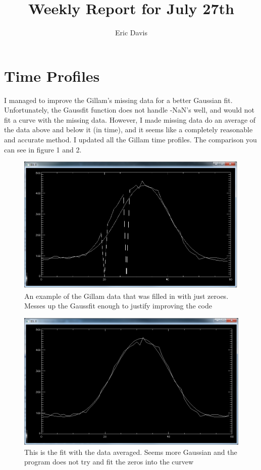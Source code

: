 \documentclass[11pt]{article}
\title{Weekly Report for July 27th}
\author{Eric Davis}
\begin{document}
\maketitle
\medskip



\section{Time Profiles}
\hspace{0.5cm}

I managed to improve the Gillam's missing data for a better Gaussian fit. Unfortunately, the Gaussfit function does not handle -NaN's well, and would not fit a curve with the missing data. However, I made missing data do an average of the data above and below it (in time), and it seems like a completely reasonable and accurate method. I updated all the Gillam time profiles. The comparison you can see in figure 1 and 2.

\begin{figure}[h!]
\includegraphics[scale=0.6]{gillam_jupiter_filled_data_11_20_2011.jpg}
\caption{An example of the Gillam data that was filled in with just zeroes. Messes up the Gaussfit enough to justify improving the code}
\end{figure}


\begin{figure}[h!]
\includegraphics[scale=0.6]{gillam_average_fill.jpg}
\caption{This is the fit with the data averaged. Seems more Gaussian and the program does not try and fit the zeros into the curvew}
\end{figure}
\end{document}
